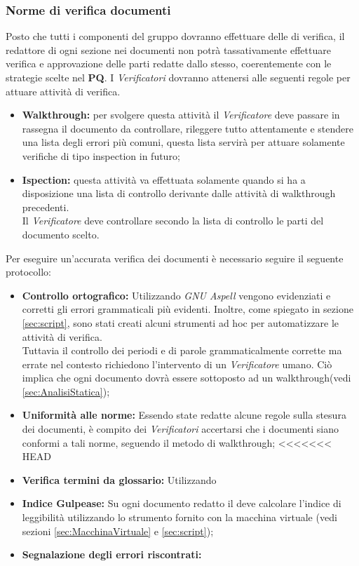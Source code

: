 \documentclass{scalatekids-article}
\begin{document}
\subsubsection{Norme di verifica documenti}
Posto che tutti i componenti del gruppo dovranno effettuare delle  di
verifica, il redattore di ogni sezione nei documenti non potrà tassativamente
effettuare verifica e approvazione delle parti redatte dallo stesso,
coerentemente con le strategie scelte nel \textbf{PQ}.
I \textit{Verificatori} dovranno attenersi alle seguenti regole per attuare attività di verifica.
\begin{itemize}
  \item \textbf{Walkthrough:} per svolgere questa attività il \textit{Verificatore} deve passare in rassegna il documento da controllare, rileggere tutto attentamente e stendere una lista degli errori più comuni, questa lista servirà per attuare solamente verifiche di tipo inspection in futuro;
  \item \textbf{Ispection:} questa attività va effettuata solamente quando si ha a disposizione una lista di controllo derivante dalle attività di walkthrough precedenti.\\
  Il \textit{Verificatore} deve controllare secondo la lista di controllo le parti del documento scelto.
\end{itemize}
Per eseguire un'accurata verifica dei documenti è necessario seguire il seguente
protocollo:
\begin{itemize}
\item\textbf{Controllo ortografico:} Utilizzando \textit{GNU Aspell} vengono evidenziati e corretti
  gli errori grammaticali più evidenti. Inoltre, come spiegato in sezione \ref{sec:script}, sono stati
  creati alcuni strumenti ad hoc per automatizzare le attività di verifica.\\
  Tuttavia il controllo dei periodi e di parole grammaticalmente corrette ma errate nel contesto richiedono
  l'intervento di un \textit{Verificatore} umano. Ciò implica che ogni documento dovrà essere sottoposto ad un walkthrough(vedi \ref{sec:AnalisiStatica});
\item\textbf{Uniformità alle norme:} Essendo state redatte alcune regole sulla stesura dei documenti, è compito dei \textit{Verificatori}
  accertarsi che i documenti siano conformi a tali norme, seguendo il metodo di walkthrough;
<<<<<<< HEAD
\item\textbf{Verifica termini da glossario:} Utilizzando
\item\textbf{Indice Gulpease:} Su ogni documento redatto il  deve calcolare l'indice di leggibilità utilizzando lo strumento fornito
  con la macchina virtuale (vedi sezioni \ref{sec:MacchinaVirtuale} e \ref{sec:script});
\item\textbf{Segnalazione degli errori riscontrati:}
\end{itemize}
\end{document}
